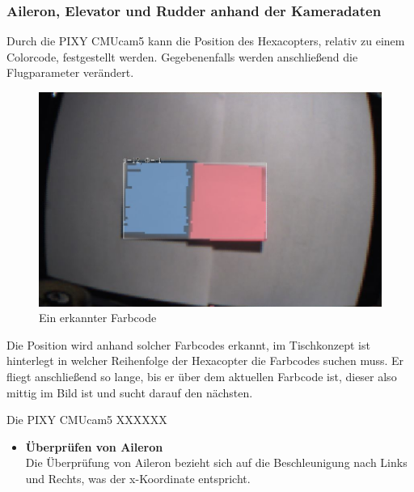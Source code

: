 \begin{itemize}
    \subsubsection{Aileron, Elevator und Rudder anhand der Kameradaten}
    Durch die PIXY CMUcam5 kann die Position des Hexacopters, relativ zu einem Colorcode, festgestellt werden. Gegebenenfalls werden anschließend die Flugparameter verändert.

    \begin{figure} [tbh]
      \begin{centering}
        \includegraphics[width = \textwidth]{Bilder/Farbcode_erkannt}
      \par\end{centering}
      \caption{Ein erkannter Farbcode}
      \label{Farbcode_erkannt}
    \end{figure}
    Die Position wird anhand solcher Farbcodes erkannt, im Tischkonzept ist hinterlegt in welcher Reihenfolge der Hexacopter die Farbcodes suchen muss.
    Er fliegt anschließend so lange, bis er über dem aktuellen Farbcode ist, dieser also mittig im Bild ist und sucht darauf den nächsten.


    Die PIXY CMUcam5 XXXXXX %



      \begin{itemize}
        \item \textbf{Überprüfen von Aileron}\\
        Die Überprüfung von Aileron bezieht sich auf die Beschleunigung nach Links und Rechts, was der x-Koordinate entspricht.


\end{itemize}
\end{itemize}
